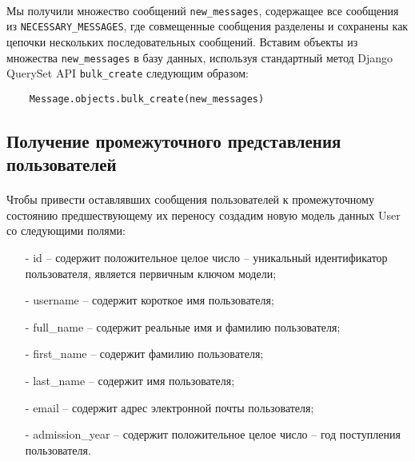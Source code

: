\documentclass[12pt, a4paper, oneside]{article}
\begin{document}
\paragraph{}
Мы получили множество сообщений \texttt{new\_messages}, содержащее все сообщения из \texttt{NECESSARY\_MESSAGES}, где совмещенные сообщения разделены и сохранены как цепочки нескольких последовательных сообщений. Вставим объекты из множества \texttt{new\_messages} в базу данных, используя стандартный метод Django QuerySet API \cite{django-queryset} \texttt{bulk\_create} следующим образом:
\begin{verbatim}
    Message.objects.bulk_create(new_messages)
\end{verbatim}
\vspace{1cm}

\subsection{Получение промежуточного представления пользователей}
\paragraph{}
Чтобы привести оставлявших сообщения пользователей к промежуточному состоянию предшествующему их переносу создадим новую модель данных User со следующими полями:
\begin{itemize}
    \item[-] id – содержит положительное целое число – уникальный идентификатор пользователя, является первичным ключом модели;
    \item[-] username – содержит короткое имя пользователя;
    \item[-] full\_name – содержит реальные имя и фамилию пользователя;
    \item[-] first\_name – содержит фамилию пользователя;
    \item[-] last\_name – содержит имя пользователя;
    \item[-] email – содержит адрес электронной почты пользователя;
    \item[-] admission\_year – содержит положительное целое число – год поступления пользователя.
\end{itemize}
\end{document}
